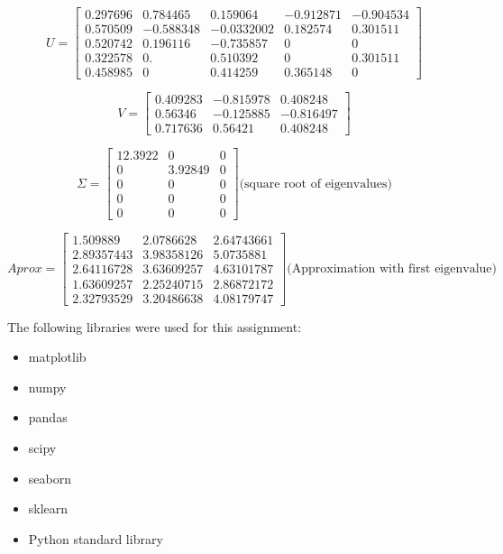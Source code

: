 \documentclass[12pt]{report}
\begin{document}
\[
U =
\begin{bmatrix}
0.297696 & 0.784465  & 0.159064 & -0.912871 & -0.904534 \\
0.570509 & -0.588348  & -0.0332002 & 0.182574 & 0.301511 \\
0.520742 & 0.196116  & -0.735857 & 0 & 0 \\
0.322578 & 0.  & 0.510392 & 0 & 0.301511 \\
0.458985 & 0 & 0.414259 & 0.365148 & 0
\end{bmatrix}
\]

\[
V =
\begin{bmatrix}
0.409283 & -0.815978 & 0.408248 \\
0.56346 & -0.125885 & -0.816497 \\
0.717636 & 0.56421 & 0.408248
\end{bmatrix}
\]

\[
\Sigma =
\begin{bmatrix}
12.3922 & 0 & 0 \\
0 & 3.92849 & 0 \\
0 & 0 & 0 \\
0 & 0 & 0 \\
0 & 0 & 0
\end{bmatrix}
\text{(square root of eigenvalues)}
\]



\[
Aprox =
\begin{bmatrix}
1.509889 & 2.0786628 & 2.64743661 \\
2.89357443 & 3.98358126 & 5.0735881 \\
2.64116728 & 3.63609257 & 4.63101787 \\
1.63609257 & 2.25240715 & 2.86872172 \\
2.32793529 & 3.20486638 & 4.08179747
\end{bmatrix}
\text{(Approximation with first eigenvalue)}
\]

\hspace{3mm}


The following libraries were used for this assignment:
\begin{itemize}
  \item matplotlib
  \item numpy
  \item pandas
  \item scipy
  \item seaborn
  \item sklearn
  \item Python standard library
\end{itemize}
\end{document}
